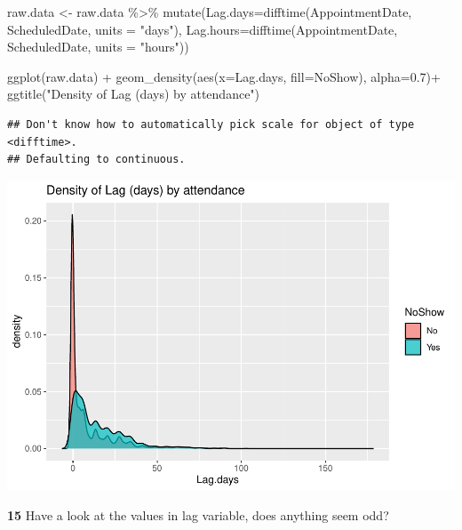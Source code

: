 \documentclass[
]{article}
\newenvironment{Shaded}{\begin{snugshade}}{\end{snugshade}}
\newcommand{\AttributeTok}[1]{\textcolor[rgb]{0.77,0.63,0.00}{#1}}
\newcommand{\FloatTok}[1]{\textcolor[rgb]{0.00,0.00,0.81}{#1}}
\newcommand{\FunctionTok}[1]{\textcolor[rgb]{0.00,0.00,0.00}{#1}}
\newcommand{\NormalTok}[1]{#1}
\newcommand{\OtherTok}[1]{\textcolor[rgb]{0.56,0.35,0.01}{#1}}
\newcommand{\SpecialCharTok}[1]{\textcolor[rgb]{0.00,0.00,0.00}{#1}}
\newcommand{\StringTok}[1]{\textcolor[rgb]{0.31,0.60,0.02}{#1}}
\begin{document}
\begin{Shaded}
\begin{Highlighting}[]
\NormalTok{raw.data }\OtherTok{\textless{}{-}}\NormalTok{ raw.data }\SpecialCharTok{\%\textgreater{}\%} \FunctionTok{mutate}\NormalTok{(}\AttributeTok{Lag.days=}\FunctionTok{difftime}\NormalTok{(AppointmentDate, ScheduledDate, }\AttributeTok{units =} \StringTok{"days"}\NormalTok{),}
                                \AttributeTok{Lag.hours=}\FunctionTok{difftime}\NormalTok{(AppointmentDate, ScheduledDate, }\AttributeTok{units =} \StringTok{"hours"}\NormalTok{))}

\FunctionTok{ggplot}\NormalTok{(raw.data) }\SpecialCharTok{+} 
  \FunctionTok{geom\_density}\NormalTok{(}\FunctionTok{aes}\NormalTok{(}\AttributeTok{x=}\NormalTok{Lag.days, }\AttributeTok{fill=}\NormalTok{NoShow), }\AttributeTok{alpha=}\FloatTok{0.7}\NormalTok{)}\SpecialCharTok{+}
  \FunctionTok{ggtitle}\NormalTok{(}\StringTok{"Density of Lag (days) by attendance"}\NormalTok{)}
\end{Highlighting}
\end{Shaded}

\begin{verbatim}
## Don't know how to automatically pick scale for object of type <difftime>.
## Defaulting to continuous.
\end{verbatim}

\begin{center}\includegraphics{lab1_medical_databases_files/figure-latex/unnamed-chunk-15-1} \end{center}

\textbf{15} Have a look at the values in lag variable, does anything
seem odd?
\end{document}

